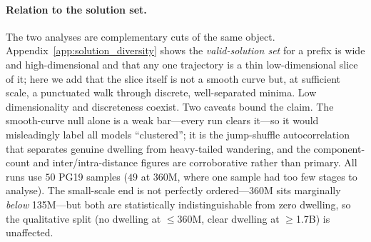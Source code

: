 \paragraph{Relation to the solution set.} The two analyses are complementary cuts of the same object. Appendix~\ref{app:solution_diversity} shows the \emph{valid-solution set} for a prefix is wide and high-dimensional and that any one trajectory is a thin low-dimensional slice of it; here we add that the slice itself is not a smooth curve but, at sufficient scale, a punctuated walk through discrete, well-separated minima. Low dimensionality and discreteness coexist. Two caveats bound the claim. The smooth-curve null alone is a weak bar---every run clears it---so it would misleadingly label all models ``clustered''; it is the jump-shuffle autocorrelation that separates genuine dwelling from heavy-tailed wandering, and the component-count and inter/intra-distance figures are corroborative rather than primary. All runs use $50$ PG19 samples ($49$ at 360M, where one sample had too few stages to analyse). The small-scale end is not perfectly ordered---360M sits marginally \emph{below} 135M---but both are statistically indistinguishable from zero dwelling, so the qualitative split (no dwelling at $\le$360M, clear dwelling at $\ge$1.7B) is unaffected.

\begin{table}[t]
    \centering
    \caption{Trajectory shape across model scale (progressive cramming, PG19, sequence length $4096$, learning rate $0.1$), comparing two definitions of the jump between consecutive converged points. \emph{Euclidean-based}: the L2 distance in the trajectory's top-$k$ PCA subspace ($k$ = PCA 99\%). \emph{Step-based}: the marginal number of optimization steps spent on that token. For each we report a gap-ratio (max\,/\,median jump; the Euclidean group also gives the smooth-curve-null mean in parentheses, $\approx 1$), the lag-1 jump-magnitude autocorrelation $r_1$ (jump-shuffle null in parentheses, $\approx 0$), and ``Dwelling \%'', the fraction of samples whose $r_1$ beats the shuffle-null $95$th percentile. ``Stages'' is the mean converged points per sample and ``PCA 99\%'' the mean trajectory dimensionality. Euclidean dwelling emerges only with scale, whereas step (effort) dwelling is present at every scale; the rising step Dwelling \% tracks trajectory length---a statistical-power effect.}
    \label{tab:trajectory_cluster_structure}
    \begin{small}
    
    \end{small}
\vskip -0.1in
\end{table}

